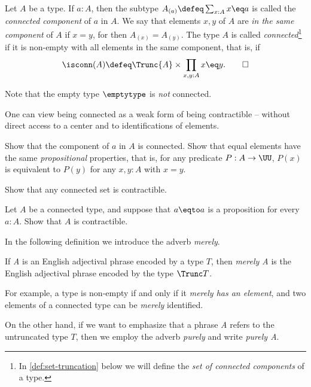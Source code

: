 \begin{definition}\label{def:connected}
  Let $A$ be a type. If $a:A$, then the subtype $A_{(a)}\defeq \sum_{x:A} x \eq a$
  is called the \emph{connected component} of $a$ in $A$.
  We say that elements $x,y$ of $A$ are \emph{in the same component} of $A$ if $x = y$, for then $A_{(x)} = A_{(y)}$.
  The type $A$ is called \emph{connected}\footnote{%
    In \cref{def:set-truncation} below we will
    define the \emph{set of connected components} of a type.}
  if it is non-empty with
  all elements in the same component, that is, if
  \[
    \isconn(A) \defeq \Trunc{A} \times \prod_{x,y:A} x \eq y.\qedhere
  \]
\end{definition}

Note that the empty type $\emptytype$ is \emph{not} connected.

One can view being connected as a weak form
of being contractible -- without direct access to a center and to
identifications of elements.

\begin{xca}\label{xca:component-connected}
  Show that the component of $a$ in $A$ is connected.
  Show that equal elements have the same
  \emph{propositional} properties, that is,
  for any predicate $P:A\to\UU$, $P(x)$ is equivalent
  to $P(y)$ for any $x,y:A$ with $x=y$.
\end{xca}

\begin{xca}\label{xca:prop-set-trivia-2}
  Show that any connected set is contractible.
\end{xca}

\begin{xca}\label{xca:connected-trivia}
Let $A$ be a connected type, and suppose that $a \eqto a$ is a proposition for every $a:A$.
Show that $A$ is contractible.
\end{xca}

In the following definition we introduce the adverb \emph{merely}.

\begin{definition}\label{def:merely}
  If \emph{A} is an English adjectival phrase encoded by a type $T$,
  then \emph{merely A} is the English adjectival phrase encoded by the type $\Trunc T$.
\end{definition}

For example, a type is non-empty if and only if it \emph{merely has an element}, and two elements of a connected type can be \emph{merely} identified.

On the other hand, if we want to emphasize that a phrase \emph{A} refers to the
untruncated type $T$, then we employ the adverb \emph{purely}
and write \emph{purely A}.


